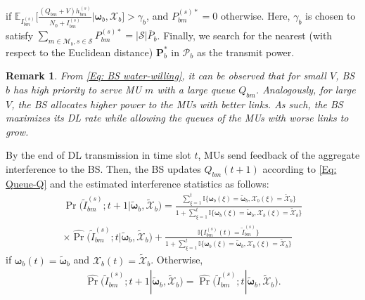 \documentclass[conference]{IEEEtran}
\newtheorem{remark}{Remark}
\newcommand{\totalpower}[1]{%
	\overline{P}_{#1}%
}
\begin{document}
%
%
%
%
%
if $\mathbb{E}_{I_{bm}^{(s)}}\Big[\frac{(Q_{bm}+V)h_{bm}^{(s)}}{N_0+ I_{bm}^{(s)}}\Big|\boldsymbol{\omega}_b,\mathcal{X}_b \Big]>\gamma_b$, and
$P_{bm}^{(s)*}=0$ otherwise.
Here, $\gamma_b$ is chosen to satisfy
$\sum_{m\in\mathcal{M}_b,s\in\mathcal{S}}P_{bm}^{(s)*} =|\mathcal{S}|\totalpower{b}$.
Finally, we search for the nearest (with respect to the Euclidean distance) $\mathbf{P}_b^{*}$ in $\mathcal{P}_b $ as the transmit power.
%
%
%
\begin{remark}\label{Remark: V impact}
From \eqref{Eq: BS water-willing}, it can be observed that for small $V$, BS $b$ has high priority to serve  MU $m$ with a large queue $Q_{bm}$.
Analogously, for large $V$, the BS allocates higher power to the MUs with better links.
As  such, the BS maximizes its DL rate while allowing the queues of the MUs with worse links to grow.
%
\end{remark}
%
%
%
By the end of DL transmission in time slot $t$,  MUs send feedback of the aggregate interference to the BS. Then, the BS updates $Q_{bm}(t+1)$ according to \eqref{Eq: Queue-Q} and the estimated interference statistics  as follows:
%
%
%
\begin{multline}\label{Eq: Empirical interference distribution-1}
\textstyle \hat{\Pr}\big(\tilde{I}_{bm}^{(s)};t+1|\tilde{\boldsymbol{\omega}}_b,\tilde{\mathcal{X}}_b\big)
%
=
 \frac{\sum_{\xi=1}^{t}\mathbb{I}\{\boldsymbol{\omega}_b(\xi)=\tilde{\boldsymbol{\omega}}_b,\mathcal{X}_b(\xi)=\tilde{\mathcal{X}}_b\}}{1+\sum_{\xi=1}^{t}\mathbb{I}\{\boldsymbol{\omega}_b(\xi)=\tilde{\boldsymbol{\omega}}_b,\mathcal{X}_b(\xi)=\tilde{\mathcal{X}}_b\}}
 \\\textstyle\times\hat{\Pr}\big(\tilde{I}_{bm}^{(s)};t|\tilde{\boldsymbol{\omega}}_b,\tilde{\mathcal{X}}_b\big)
+\frac{\mathbb{I}\big\{I_{bm}^{(s)}(t)=\tilde{I}_{bm}^{(s)}\big\} }{1+\sum_{\xi=1}^{t}\mathbb{I}\{\boldsymbol{\omega}_b(\xi)=\tilde{\boldsymbol{\omega}}_b,\mathcal{X}_b(\xi)=\tilde{\mathcal{X}}_b\}}
%
\end{multline}
%
%
%
if $\boldsymbol{\omega}_b(t)=\tilde{\boldsymbol{\omega}}_b$ and $\mathcal{X}_b(t)=\tilde{\mathcal{X}}_b$.
 Otherwise,
\begin{align}\label{Eq: Empirical interference distribution-2}
\textstyle \hat{\Pr}\big(\tilde{I}_{bm}^{(s)};t+1|\tilde{\boldsymbol{\omega}}_b,\tilde{\mathcal{X}}_b\big)
%
= \hat{\Pr}\big(\tilde{I}_{bm}^{(s)};t|\tilde{\boldsymbol{\omega}}_b,\tilde{\mathcal{X}}_b\big).
%
\end{align}
\end{document}
